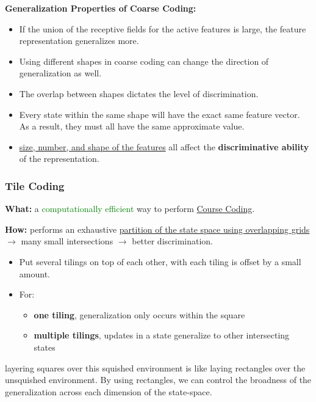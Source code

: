 \documentclass[12pt, a4paper]{article}
\begin{document}
\textbf{Generalization Properties of Coarse Coding:}
\begin{itemize}
  \item If the union of the receptive fields for the active features is large, the feature representation generalizes more.
  \item Using different shapes in coarse coding can change the direction of generalization as well.
  \item The overlap between shapes dictates the level of discrimination.
  \item Every state within the same shape will have the exact same feature vector. As a result, they must all have the same approximate value.
  \item \uline{size, number, and shape of the features} all affect the \textbf{discriminative ability} of the representation.
\end{itemize}





\subsubsection{Tile Coding}\label{tile-coding}

\textbf{What:} a \textcolor{Green}{computationally efficient} way to perform \uline{Course Coding}.

\textbf{How:} performs an exhaustive \uline{partition of the state space using overlapping grids} $\rightarrow$ many small intersections $\rightarrow$ better discrimination.

\begin{itemize}
  \item Put several tilings on top of each other, with each tiling is offset by a small amount.
  \item For:
  \begin{itemize}
    \item \textbf{one tiling}, generalization only occurs within the square
    \item \textbf{multiple tilings}, updates in a state generalize to other intersecting states
  \end{itemize}
\end{itemize}

layering squares over this squished environment is like laying rectangles over the unsquished environment. By using rectangles, we can control the broadness of the generalization across each dimension of the state-space.
\end{document}
